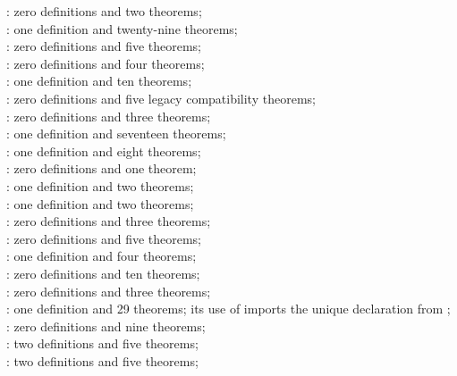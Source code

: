 \documentclass[11pt,a4paper,oneside,openany]{book}
\theoremstyle{definition}
\theoremstyle{remark}
\begin{document}
\begin{center}
: zero definitions and two theorems;\\
: one definition and twenty-nine theorems;\\
: zero definitions and five theorems;\\
: zero definitions and four theorems;\\
: one definition and ten theorems;\\
: zero definitions and five legacy compatibility
theorems;\\
: zero definitions and three
theorems;\\
: one definition and seventeen
theorems;\\
: one definition and eight
theorems;\\
: zero definitions and one
theorem;\\
: one definition and two
theorems;\\
: one definition and two
theorems;\\
: zero definitions and three
theorems;\\
: zero definitions and five theorems;\\
: one definition and four theorems;\\
: zero definitions and ten theorems;\\
: zero definitions and three theorems;\\
: one definition and 29 theorems; its
use of  imports the unique
declaration from ;\\
: zero definitions and nine
theorems;\\
: two definitions and five theorems;\\
: two definitions and five theorems;\\

\end{center}
\end{document}
